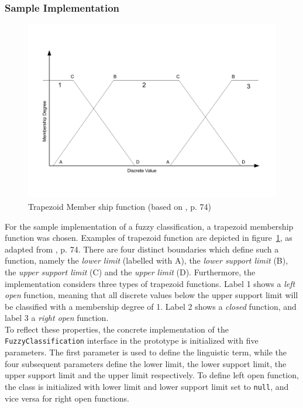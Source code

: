 \documentclass[a4paper]{article}
\begin{document}
\subsubsection{Sample Implementation}
\begin{figure}[h]
	\centering
	\includegraphics[scale=0.5]{images/trapezoid.pdf}
	\caption{Trapezoid Member ship function (based on \cite{faseld2012}, p. 74)}
	\label{trapezoid_functions}
\end{figure}

For the sample implementation of a fuzzy classification, a trapezoid membership function was chosen. Examples of trapezoid function are depicted in figure~\ref{trapezoid_functions}, as adapted from \cite{faseld2012}, p. 74. There are four distinct boundaries which define such a function, namely the \textit{lower limit} (labelled with A), the \textit{lower support limit} (B), the \textit{upper support limit} (C) and the \textit{upper limit} (D). Furthermore, the implementation considers three types of trapezoid functions. Label 1 shows a \textit{left open} function, meaning that all discrete values below the upper support limit will be classified with a membership degree of 1. Label 2 shows a \textit{closed} function, and label 3 a \textit{right open} function.\\
To reflect these properties, the concrete implementation of the \texttt{FuzzyClassification} interface in the prototype is initialized with five parameters. The first parameter is used to define the linguistic term, while the four subsequent parameters define the lower limit, the lower support limit, the upper support limit and the upper limit respectively. To define left open function, the class is initialized with lower limit and lower support limit set to \texttt{null}, and vice versa for right open functions.\\
\end{document}
